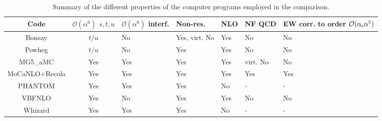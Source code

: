 \begin{table*}[ht!]
    \footnotesize
    \begin{tabularx}{\textwidth}{c|c|X|X|X|X|X}
        Code  &  $\mathcal O(\alpha^6)$ $s, t, u$  &  $\mathcal O(\alpha^6)$ interf.  &  Non-res.  & NLO &  NF QCD  &  EW corr. to order $\mathcal O(\alpha_\text{s} \alpha^5)$  \\
        \hline
        \hline
        {\sc Bonsay}        &  $t/u$    &  No       &  Yes, virt. No    &  Yes   & No       &  No  \\
        {\sc Powheg}        &  $t/u$    &  No       &  Yes              &  Yes   & No       &  No  \\
        {\sc MG5\_aMC}      &  Yes      &  Yes      &  Yes              &  Yes   & virt. No &  No \\
        {\sc MoCaNLO+Recola}&  Yes      &  Yes      &  Yes              &  Yes   & Yes      &  Yes  \\
        {\sc PHANTOM}       &  Yes      &  Yes      &  Yes              &  No    & -        & - \\
        {\sc VBFNLO}        &  Yes      &  No       &  Yes              &  Yes   & No       &  No  \\
        {\sc Whizard}       &  Yes      &  Yes      &  Yes              &  No    & -        & - \\
    \end{tabularx}
    \caption{\label{tab:wg1_codes} Summary of the different properties of the computer programs employed in the comparison.}
\end{table*}